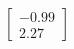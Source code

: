 \documentclass[preview]{standalone}
\begin{document}
\begin{align*}
\begin{bmatrix} -0.99 \\ 2.27 \end{bmatrix}
\end{align*}
\end{document}
